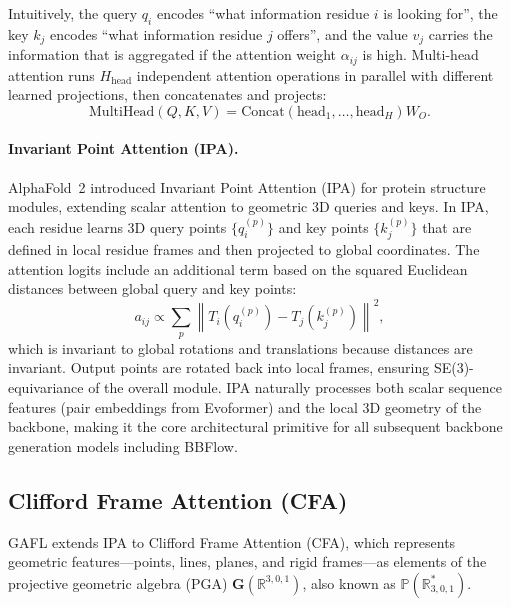 \documentclass[12pt,a4paper]{article}
\newcommand{\norm}[1]{\left\|#1\right\|}
\begin{document}
Intuitively, the query $q_i$ encodes ``what information residue $i$ is looking for'', the key
$k_j$ encodes ``what information residue $j$ offers'', and the value $v_j$ carries the
information that is aggregated if the attention weight $\alpha_{ij}$ is high.  Multi-head
attention runs $H_{\mathrm{head}}$ independent attention operations in parallel with different
learned projections, then concatenates and projects:
\begin{equation}
  \mathrm{MultiHead}(Q,K,V) = \mathrm{Concat}(\mathrm{head}_1, \ldots, \mathrm{head}_{H}) W_O.
\end{equation}

\paragraph{Invariant Point Attention (IPA).}
AlphaFold~2 \citep{jumper2021} introduced Invariant Point Attention (IPA) for protein structure
modules, extending scalar attention to geometric 3D queries and keys.  In IPA, each residue
learns 3D query points $\{q_i^{(p)}\}$ and key points $\{k_j^{(p)}\}$ that are defined in
local residue frames and then projected to global coordinates.  The attention logits include
an additional term based on the squared Euclidean distances between global query and key points:
\begin{equation}
  a_{ij} \propto \sum_p \norm{T_i(q_i^{(p)}) - T_j(k_j^{(p)})}^2,
\end{equation}
which is invariant to global rotations and translations because distances are invariant.  Output
points are rotated back into local frames, ensuring SE(3)-equivariance of the overall module.
IPA naturally processes both scalar sequence features (pair embeddings from Evoformer) and
the local 3D geometry of the backbone, making it the core architectural primitive for all
subsequent backbone generation models including BBFlow.

\subsection{Clifford Frame Attention (CFA)}
\label{sec:cfa}

GAFL \citep{wagner2024gafl} extends IPA to Clifford Frame Attention (CFA), which represents
geometric features---points, lines, planes, and rigid frames---as elements of the projective
geometric algebra (PGA) $\mathbf{G}(\mathbb{R}^{3,0,1})$, also known as $\mathbb{P}(\mathbb{R}^*_{3,0,1})$.
\end{document}
